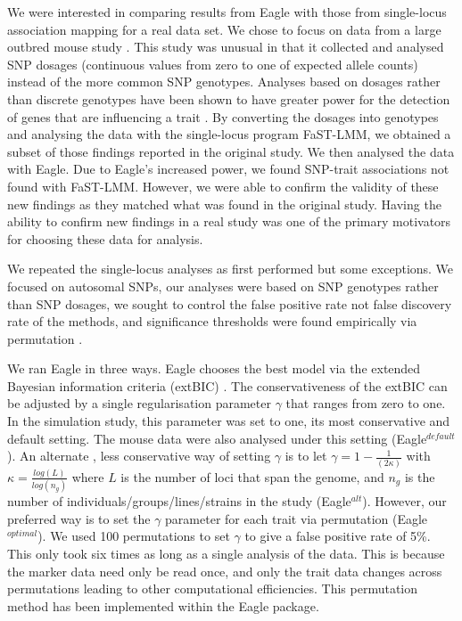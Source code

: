 \documentclass{article}
\begin{document}
We were interested in comparing results from Eagle with those from single-locus association mapping for a real data set.
 We chose to focus on data from a large outbred mouse study \citep{nicod2016genome}. This study was unusual in that it collected and analysed SNP dosages (continuous values from zero to one of expected allele counts)  instead of the more common SNP genotypes. Analyses based on dosages rather than discrete genotypes have been shown to have greater power for the detection of genes that are influencing a trait  \citep{zheng2011comparison}. By converting the dosages into genotypes and analysing the data with the single-locus program FaST-LMM, we obtained a subset of those findings reported in the original study. We then analysed the data with Eagle. Due to Eagle's increased power, we found SNP-trait associations not found with  FaST-LMM. However, we were 
 able to confirm the validity of these new findings as they matched what was found in the original study. Having the ability to confirm new findings  in a real study was 
 one of the primary motivators for choosing these data for analysis. 

We repeated the single-locus analyses as first performed \citep{nicod2016genome} but some exceptions. We 
focused on autosomal SNPs, our analyses were based on SNP genotypes  rather than SNP dosages, 
we sought to control the false positive rate not false discovery rate of the methods, and significance thresholds were 
found empirically via permutation \citep{doerge1996permutation}.


We ran Eagle in three ways. 
Eagle chooses the best model via the extended Bayesian information criteria (extBIC) \citep{chen2008extended}. 
  The conservativeness of the extBIC can be adjusted by a single regularisation parameter  $\gamma$ that ranges from zero to one. 
In the simulation study, this parameter was set to one, its most conservative and default setting. The mouse data were also analysed 
under this setting (Eagle$^{default}$).  An alternate  \citep{chen2008extended}, less conservative way of setting $\gamma$ is to  let $\gamma = 1 - \frac{1}{(2\kappa)}$ with $\kappa=\frac{log(L)}{log(n_g)}$ where 
 $L$ is the number of loci that span the genome, and $n_g$ is the number of individuals/groups/lines/strains in the study
  (Eagle$^{alt}$). However, our preferred way is to set the $\gamma$ parameter for each trait via permutation (Eagle$^{optimal}$).  We used 100 permutations to set $\gamma$ to give a false  positive rate of 5\%.  This only took six times as long as a single analysis of the data. This is because the marker data need only be read  once, 
 and only the trait data changes across permutations leading to other computational efficiencies.  
  This permutation method has been implemented within the
 Eagle package. 
  
\end{document}
